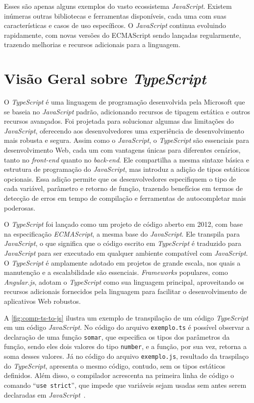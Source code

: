 Esses são apenas alguns exemplos do vasto ecossistema \textit{JavaScript}. Existem inúmeras outras bibliotecas e ferramentas disponíveis, cada uma com suas características e casos de uso específicos. O \textit{JavaScript} continua evoluindo rapidamente, com novas versões do ECMAScript sendo lançadas regularmente, trazendo melhorias e recursos adicionais para a linguagem.


\section{Visão Geral sobre \textit{TypeScript} \label{JS_visaoGeralTS}}

O \textit{TypeScript} é uma linguagem de programação desenvolvida pela Microsoft que se baseia no \textit{JavaScript} padrão, adicionando recursos de tipagem estática e outros recursos avançados. Foi projetada para solucionar algumas das limitações do \textit{JavaScript}, oferecendo aos desenvolvedores uma experiência de desenvolvimento mais robusta e segura. Assim como o \textit{JavaScript}, o \textit{TypeScript} são essenciais para desenvolvimento Web, cada um com vantagens únicas para diferentes cenários, tanto no \textit{front-end} quanto no \textit{back-end}. Ele compartilha a mesma sintaxe básica e estrutura de programação do \textit{JavaScript}, mas introduz a adição de tipos estáticos opcionais. Essa adição permite que os desenvolvedores especifiquem o tipo de cada variável, parâmetro e retorno de função, trazendo benefícios em termos de detecção de erros em tempo de compilação e ferramentas de autocompletar mais poderosas.

O \textit{TypeScript} foi lançado como um projeto de código aberto em 2012, com base na especificação \textit{ECMAScript}, a mesma base do \textit{JavaScript}. Ele transpila para \textit{JavaScript}, o que significa que o código escrito em \textit{TypeScript} é traduzido para \textit{JavaScript} para ser executado em qualquer ambiente compatível com \textit{JavaScript}. O \textit{TypeScript} é amplamente adotado em projetos de grande escala, nos quais a manutenção e a escalabilidade são essenciais. \textit{Frameworks} populares, como \textit{Angular.js}, adotam o \textit{TypeScript} como sua linguagem principal, aproveitando os recursos adicionais fornecidos pela linguagem para facilitar o desenvolvimento de aplicativos Web robustos.

A \autoref{fig:comp-ts-to-js} ilustra um exemplo de transpilação de um código \textit{TypeScript} em um código \textit{JavaScript}. No código do arquivo \texttt{exemplo.ts} é possível observar a declaração de uma função \texttt{somar}, que especifica os tipos dos parâmetros da função, sendo eles dois valores do tipo \texttt{number}, e a função, por sua vez, retorna a soma desses valores. Já no código do arquivo \texttt{exemplo.js}, resultado da traspilaço do \textit{TypeScript}, apresenta o mesmo código, contudo, sem os tipos estáticos definidos. Além disso, o compilador acrescenta na primeira linha de código o comando ``\texttt{use strict}'', que impede que variáveis sejam usadas sem antes serem declaradas em \textit{JavaScript}~\cite{w3schools_js_strict}.

